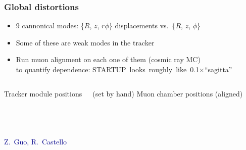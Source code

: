 \documentclass[compress]{beamer}
\begin{document}
\begin{frame}
\frametitle{Global distortions}

\begin{itemize}
\item 9 cannonical modes: \{$R$, $z$, $r\phi$\} displacements vs.\ \{$R$, $z$, $\phi$\}
\item Some of these are weak modes in the tracker
\item Run muon alignment on each one of them (cosmic ray MC) \\ to quantify dependence: \mbox{STARTUP looks roughly like 0.1$\times$``sagitta''\hspace{-1 cm}}
\end{itemize}

\begin{columns}
\centering
Tracker module positions

(set by hand)
\centering
Muon chamber positions (aligned)

\mbox{ }
\end{columns}

\vspace{-0.2 cm}
\mbox{\hspace{-0.5 cm} \hspace{0.2 cm}
\hspace{-0.5 cm}}

\begin{columns}
\centering
\textcolor{darkblue}{\scriptsize Z.~Guo, R.~Castello}
\mbox{ }
\end{columns}
\end{frame}
\end{document}
